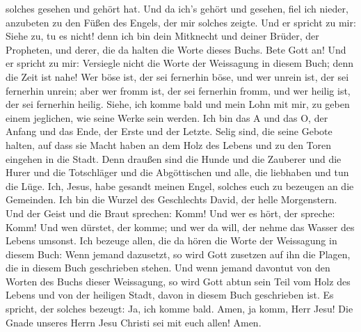 solches gesehen und gehört hat. Und da ich's gehört und gesehen, fiel
ich nieder, anzubeten zu den Füßen des Engels, der mir solches zeigte.
 Und er spricht zu mir: Siehe zu, tu es nicht! denn ich bin
dein Mitknecht und deiner Brüder, der Propheten, und derer, die da
halten die Worte dieses Buchs. Bete Gott an!  Und er
spricht zu mir: Versiegle nicht die Worte der Weissagung in diesem Buch;
denn die Zeit ist nahe!  Wer böse ist, der sei fernerhin
böse, und wer unrein ist, der sei fernerhin unrein; aber wer fromm ist,
der sei fernerhin fromm, und wer heilig ist, der sei fernerhin heilig.
 Siehe, ich komme bald und mein Lohn mit mir, zu geben
einem jeglichen, wie seine Werke sein werden.  Ich bin das
A und das O, der Anfang und das Ende, der Erste und der Letzte.
 Selig sind, die seine Gebote halten, auf dass sie Macht
haben an dem Holz des Lebens und zu den Toren eingehen in die Stadt.
 Denn draußen sind die Hunde und die Zauberer und die Hurer
und die Totschläger und die Abgöttischen und alle, die liebhaben und tun
die Lüge.  Ich, Jesus, habe gesandt meinen Engel, solches
euch zu bezeugen an die Gemeinden. Ich bin die Wurzel des Geschlechts
David, der helle Morgenstern.  Und der Geist und die Braut
sprechen: Komm! Und wer es hört, der spreche: Komm! Und wen dürstet, der
komme; und wer da will, der nehme das Wasser des Lebens umsonst.
 Ich bezeuge allen, die da hören die Worte der Weissagung
in diesem Buch: Wenn jemand dazusetzt, so wird Gott zusetzen auf ihn die
Plagen, die in diesem Buch geschrieben stehen.  Und wenn
jemand davontut von den Worten des Buchs dieser Weissagung, so wird Gott
abtun sein Teil vom Holz des Lebens und von der heiligen Stadt, davon in
diesem Buch geschrieben ist.  Es spricht, der solches
bezeugt: Ja, ich komme bald. Amen, ja komm, Herr Jesu!  Die
Gnade unseres Herrn Jesu Christi sei mit euch allen! Amen.
